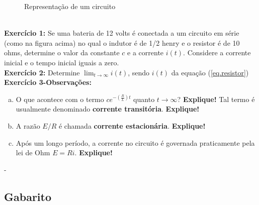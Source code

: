 \documentclass[a4paper, 12pt, addpoints]{exam}
\begin{document}
\begin{questions}
\begin{figure}[hbt]
\caption{Representação de um circuito}
\label{Fig:Circ}
\end{figure}\\
\textbf{Exercício 1:} Se uma bateria de 12 volts é conectada a um circuito em série (como na figura acima) no qual o indutor é de 1/2 henry e o resistor é de 10 ohms, determine o valor da constante $c$ e a corrente $i(t)$. Considere a corrente inicial e o tempo inicial iguais a zero.\\
\textbf{Exercício 2:} Determine $\displaystyle\lim_{t\to \infty} i(t)$, sendo $i(t)$ da equação (\ref{eq.resistor})\\
\textbf{Exercício 3-Observações:} 
\begin{enumerate}[a)]
\item O que acontece com o termo $ce^{-\left(\frac{R}{L}\right)t}$ quanto $\displaystyle {t\to \infty}$? \textbf{Explique!} Tal termo é usualmente denominado \textbf{corrente transitória}. \textbf{Explique!}
\item A razão $E/R$ é chamada \textbf{corrente estacionária}. \textbf{Explique!} 
\item Após um longo período, a corrente no circuito é governada praticamente pela lei de Ohm $E= Ri $. \textbf{Explique!}
\end{enumerate}
\begin{resp}
 -
\end{resp}
\end{questions}

\vspace{1cm}
\begin{center}
    \section*{Gabarito}
\end{center}
\end{document}
